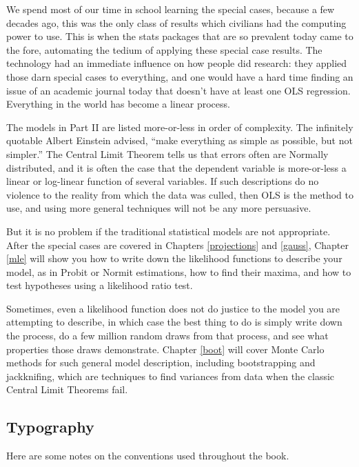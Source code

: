 We spend most of our time in school learning the special cases,
because a few decades ago, this was the only class of results which
civilians had the computing power to use. This is when the stats packages
that are so prevalent today came to the fore, automating the tedium of
applying these special case results. The technology had an immediate
influence on how people did research: they applied those darn special
cases to everything, and one would have a hard time finding an issue of an
academic journal today that doesn't have at least one OLS regression.
Everything in the world has become a linear process.


The models in Part II are listed more-or-less in order of complexity.
The infinitely quotable Albert Einstein advised, ``make everything as
simple as possible, but not simpler.''  
The Central Limit Theorem tells us that errors often are
Normally distributed, and it is often the case that the dependent
variable is more-or-less a linear or log-linear function of several
variables. If such descriptions do no violence to the reality from
which the data was culled, then OLS is the method to use, and using more
general techniques will not be any more persuasive. 

But it is no problem if the traditional statistical models are not appropriate.
After the special cases are covered in Chapters \ref{projections}
and \ref{gauss}, Chapter \ref{mle} will show you how to write down the
likelihood functions to describe your model, as in Probit or Normit
estimations, how to find their maxima, and how to test hypotheses using
a likelihood ratio test.

Sometimes, even a likelihood function does not do justice to the model
you are attempting to describe, in which case the best thing to do is
simply write down the process, do a few million random draws from
that process, and see what properties those draws demonstrate.
Chapter \ref{boot} will cover Monte Carlo methods for such general
model description, including bootstrapping and jackknifing, which are
techniques to find variances from data when the classic Central Limit
Theorems fail.  

  

\subsection{Typography}
Here are some notes on the conventions used throughout the book.

